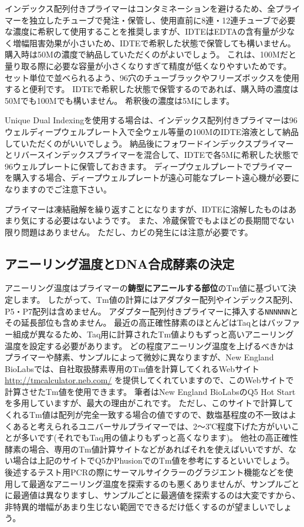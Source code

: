 \documentclass[titlepage,10pt,a4paper,uplatex]{jsbook}
\renewcommand{\textbf}[1]{{\bfseries\sffamily#1}}
\begin{document}
インデックス配列付きプライマーはコンタミネーションを避けるため、全プライマーを独立したチューブで発注・保管し、使用直前に8連・12連チューブで必要な濃度に希釈して使用することを推奨しますが、IDTEはEDTAの含有量が少なく増幅阻害効果が小さいため、IDTEで希釈した状態で保管しても構いません。
購入時は50{\textmu}Mの濃度で納品していただくのがよいでしょう。
これは、100{\textmu}Mだと量り取る際に必要な容量が小さくなりすぎて精度が低くなりやすいためです。
セット単位で並べられるよう、96穴のチューブラックやフリーズボックスを使用すると便利です。
IDTEで希釈した状態で保管するのであれば、購入時の濃度は50{\textmu}Mでも100{\textmu}Mでも構いません。
希釈後の濃度は5{\textmu}Mにします。

Unique Dual Indexingを使用する場合は、インデックス配列付きプライマーは96ウェルディープウェルプレート入で全ウェル等量の100{\textmu}MのIDTE溶液として納品していただくのがいいでしょう。
納品後にフォワードインデックスプライマーとリバースインデックスプライマーを混合して、IDTEで各5{\textmu}Mに希釈した状態で96ウェルプレートに保管しておきます。
ディープウェルプレートでプライマーを購入する場合、ディープウェルプレートが遠心可能なプレート遠心機が必要になりますのでご注意下さい。

プライマーは凍結融解を繰り返すことになりますが、IDTEに溶解したものはあまり気にする必要はないようです\citep{Speicher2017}。
また、冷蔵保管でもよほどの長期間でない限り問題はありません。
ただし、カビの発生には注意が必要です。

\subsection{アニーリング温度とDNA合成酵素の決定}

アニーリング温度はプライマーの\textbf{鋳型にアニールする部位}のTm値に基づいて決定します。
したがって、Tm値の計算にはアダプター配列やインデックス配列、P5・P7配列は含めません。
アダプター配列付きプライマーに挿入する\texttt{NNNNNN}とその延長部位も含めません。
最近の高正確性酵素のほとんどはTaqとはバッファー組成が異なるため、Taq用に計算されたTm値よりもずっと高いアニーリング温度を設定する必要があります。
どの程度アニーリング温度を上げるべきかはプライマーや酵素、サンプルによって微妙に異なりますが、New England BioLabsでは、自社取扱酵素専用のTm値を計算してくれるWebサイト \url{http://tmcalculator.neb.com/} を提供してくれていますので、このWebサイトで計算させたTm値を使用できます。
筆者はNew England BioLabsのQ5 Hot Startを多用していますが、最大の理由がこれです。
ただし、このサイトで計算してくれるTm値は配列が完全一致する場合の値ですので、数塩基程度の不一致はよくあると考えられるユニバーサルプライマーでは、2～3℃程度下げた方がいいことが多いです(それでもTaq用の値よりもずっと高くなります)。
他社の高正確性酵素の場合、専用のTm値計算サイトなどがあればそれを使えばいいですが、ない場合は上記のサイトでQ5かPhusionでのTm値を参考にするといいでしょう。
後述するテスト用PCRの際にサーマルサイクラーのグラジエント機能などを使用して最適なアニーリング温度を探索するのも悪くありませんが、サンプルごとに最適値は異なりますし、サンプルごとに最適値を探索するのは大変ですから、非特異的増幅があまり生じない範囲でできるだけ低くするのが望ましいでしょう。
\end{document}
